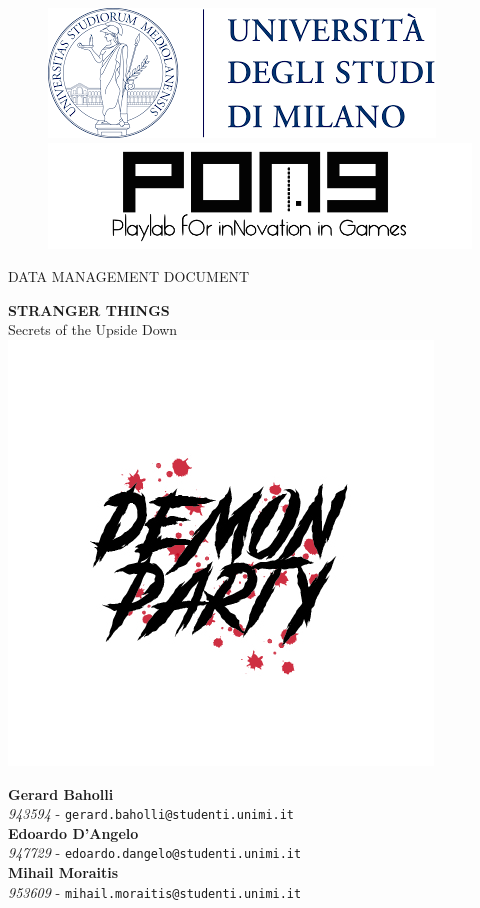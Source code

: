 \thispagestyle{empty}
{

	\begin{figure}
		\begin{minipage}{0.5\textwidth}
			\centering
			\includegraphics[width=0.6\linewidth]{images/unimi_logo.png}
		\end{minipage}\hfill
		\begin{minipage}{0.5\textwidth}
			\centering
			\includegraphics[width=0.6\linewidth]{images/pong_logo.png}
		\end{minipage}
	\end{figure}

	\vspace*{0.6cm}
	\begin{center}
		\Huge DATA MANAGEMENT DOCUMENT\\
	\end{center}
	
	\vspace{0.6cm}
	\begin{center}
		\Huge \textbf{STRANGER THINGS}\\
		\Huge {Secrets of the Upside Down}\\
		\includegraphics[width=0.7\linewidth]{images/demonparty_logo.jpg}\\[4ex]
	\end{center}

	\vfill
	\textbf{Gerard Baholli}\\
	\textit{943594} - \texttt{gerard.baholli@studenti.unimi.it}\\
	
	\textbf{Edoardo D'Angelo}\\
	\textit{947729} - \texttt{edoardo.dangelo@studenti.unimi.it}\\
	
	\textbf{Mihail Moraitis}\\
	\textit{953609} - \texttt{mihail.moraitis@studenti.unimi.it}\\

}